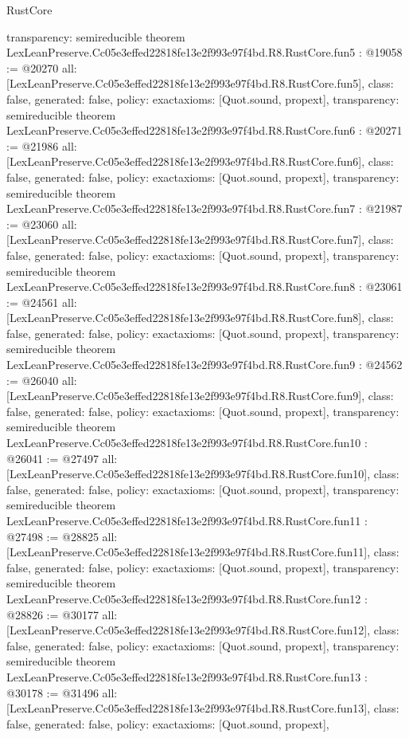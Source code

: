 \begin{lexlean}{RustCore}
\begin{coremodule}
{  transparency: semireducible
}
theorem LexLeanPreserve.Cc05e3effed22818fe13e2f993e97f4bd.R8.RustCore.fun5 : @19058 := @20270 {
  all: [LexLeanPreserve.Cc05e3effed22818fe13e2f993e97f4bd.R8.RustCore.fun5],
  class: false,
  generated: false,
  policy: exact{axioms: [Quot.sound, propext]},
  transparency: semireducible
}
theorem LexLeanPreserve.Cc05e3effed22818fe13e2f993e97f4bd.R8.RustCore.fun6 : @20271 := @21986 {
  all: [LexLeanPreserve.Cc05e3effed22818fe13e2f993e97f4bd.R8.RustCore.fun6],
  class: false,
  generated: false,
  policy: exact{axioms: [Quot.sound, propext]},
  transparency: semireducible
}
theorem LexLeanPreserve.Cc05e3effed22818fe13e2f993e97f4bd.R8.RustCore.fun7 : @21987 := @23060 {
  all: [LexLeanPreserve.Cc05e3effed22818fe13e2f993e97f4bd.R8.RustCore.fun7],
  class: false,
  generated: false,
  policy: exact{axioms: [Quot.sound, propext]},
  transparency: semireducible
}
theorem LexLeanPreserve.Cc05e3effed22818fe13e2f993e97f4bd.R8.RustCore.fun8 : @23061 := @24561 {
  all: [LexLeanPreserve.Cc05e3effed22818fe13e2f993e97f4bd.R8.RustCore.fun8],
  class: false,
  generated: false,
  policy: exact{axioms: [Quot.sound, propext]},
  transparency: semireducible
}
theorem LexLeanPreserve.Cc05e3effed22818fe13e2f993e97f4bd.R8.RustCore.fun9 : @24562 := @26040 {
  all: [LexLeanPreserve.Cc05e3effed22818fe13e2f993e97f4bd.R8.RustCore.fun9],
  class: false,
  generated: false,
  policy: exact{axioms: [Quot.sound, propext]},
  transparency: semireducible
}
theorem LexLeanPreserve.Cc05e3effed22818fe13e2f993e97f4bd.R8.RustCore.fun10 : @26041 := @27497 {
  all: [LexLeanPreserve.Cc05e3effed22818fe13e2f993e97f4bd.R8.RustCore.fun10],
  class: false,
  generated: false,
  policy: exact{axioms: [Quot.sound, propext]},
  transparency: semireducible
}
theorem LexLeanPreserve.Cc05e3effed22818fe13e2f993e97f4bd.R8.RustCore.fun11 : @27498 := @28825 {
  all: [LexLeanPreserve.Cc05e3effed22818fe13e2f993e97f4bd.R8.RustCore.fun11],
  class: false,
  generated: false,
  policy: exact{axioms: [Quot.sound, propext]},
  transparency: semireducible
}
theorem LexLeanPreserve.Cc05e3effed22818fe13e2f993e97f4bd.R8.RustCore.fun12 : @28826 := @30177 {
  all: [LexLeanPreserve.Cc05e3effed22818fe13e2f993e97f4bd.R8.RustCore.fun12],
  class: false,
  generated: false,
  policy: exact{axioms: [Quot.sound, propext]},
  transparency: semireducible
}
theorem LexLeanPreserve.Cc05e3effed22818fe13e2f993e97f4bd.R8.RustCore.fun13 : @30178 := @31496 {
  all: [LexLeanPreserve.Cc05e3effed22818fe13e2f993e97f4bd.R8.RustCore.fun13],
  class: false,
  generated: false,
  policy: exact{axioms: [Quot.sound, propext]},
}
\end{coremodule}
\end{lexlean}
